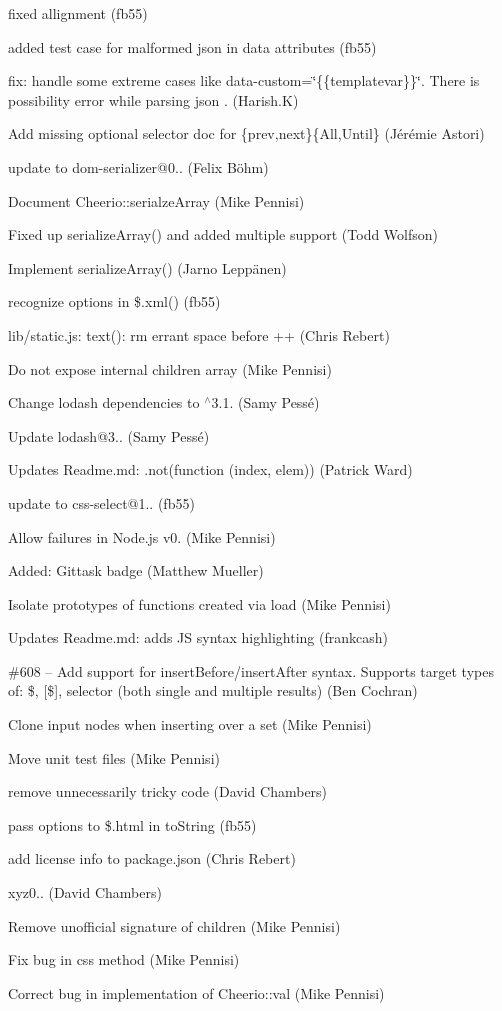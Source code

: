 \begin{DoxyItemize}
\item fixed allignment (fb55)
\item added test case for malformed json in data attributes (fb55)
\item fix\+: handle some extreme cases like {\ttfamily data-\/custom=\char`\"{}\{\{templatevar\}\}\char`\"{}}. There is possibility error while parsing json . (Harish.\+K)
\item Add missing optional selector doc for \{prev,next\}\{All,Until\} (Jérémie Astori)
\item update to dom-\/serializer@0.. (Felix Böhm)
\item Document {\ttfamily Cheerio\+::serialze\+Array} (Mike Pennisi)
\item Fixed up {\ttfamily serialize\+Array()} and added multiple support (Todd Wolfson)
\item Implement serialize\+Array() (Jarno Leppänen)
\item recognize options in \$.xml() (fb55)
\item lib/static.\+js\+: text()\+: rm errant space before ++ (Chris Rebert)
\item Do not expose internal {\ttfamily children} array (Mike Pennisi)
\item Change lodash dependencies to $^\wedge$3.1. (Samy Pessé)
\item Update lodash@3.. (Samy Pessé)
\item Updates Readme.\+md\+: .not(function (index, elem)) (Patrick Ward)
\item update to css-\/select@1.. (fb55)
\item Allow failures in Node.\+js v0. (Mike Pennisi)
\item Added\+: Gittask badge (Matthew Mueller)
\item Isolate prototypes of functions created via {\ttfamily load} (Mike Pennisi)
\item Updates Readme.\+md\+: adds JS syntax highlighting (frankcash)
\item \#608 -- Add support for insert\+Before/insert\+After syntax. Supports target types of\+: \$, \mbox{[}\$\mbox{]}, selector (both single and multiple results) (Ben Cochran)
\item Clone input nodes when inserting over a set (Mike Pennisi)
\item Move unit test files (Mike Pennisi)
\item remove unnecessarily tricky code (David Chambers)
\item pass options to \$.html in to\+String (fb55)
\item add license info to package.\+json (Chris Rebert)
\item xyz0.. (David Chambers)
\item Remove unofficial signature of {\ttfamily children} (Mike Pennisi)
\item Fix bug in {\ttfamily css} method (Mike Pennisi)
\item Correct bug in implementation of {\ttfamily Cheerio\+::val} (Mike Pennisi)
\end{DoxyItemize}

